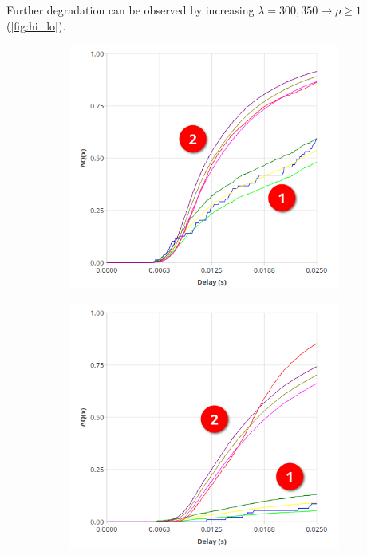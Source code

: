     Further degradation can be observed by increasing $\lambda = {300, 350} \rightarrow \rho \ge 1$ (\cref{fig:hi_lo}).

    \begin{figure}[H]
            \centering
            \begin{subfigure}{.5\textwidth}
                \centering
                \includegraphics[width=0.98\textwidth]{img/overload_2/300_probe2.png}
                \label{fig:high_load_1}
            \end{subfigure}%
            \begin{subfigure}{.5\textwidth}
                \centering
                \includegraphics[width =0.98\textwidth]{img/overload_2/350_probe2.png}

\end{subfigure}
\end{figure}
